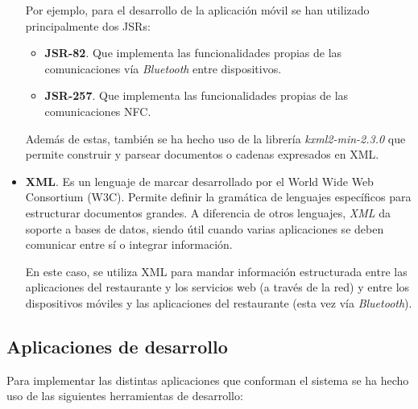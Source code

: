 \begin{itemize}
  Por ejemplo, para el desarrollo de la aplicación móvil se han utilizado
  principalmente dos \acs{JSR}s:
    \begin{itemize}
    \item \textbf{JSR-82}. Que implementa las funcionalidades
    propias de las comunicaciones vía \emph{Bluetooth} entre dispositivos.
    \item \textbf{JSR-257}. Que implementa las funcionalidades propias
    de las comunicaciones \acs{NFC}.
    \end{itemize}

  Además de estas, también se ha hecho uso de la librería
  \emph{kxml2-min-2.3.0} que permite construir y parsear documentos o cadenas 
  expresados en \acs{XML}.

  \item \textbf{XML}.
  Es un lenguaje de marcar desarrollado por el
  World Wide Web Consortium (\acs{W3C}). Permite definir la gramática de
  lenguajes específicos para estructurar documentos grandes. A diferencia de
  otros lenguajes, \emph{XML} da soporte a bases de datos, siendo útil cuando
  varias aplicaciones se deben comunicar entre sí o integrar información.

  En este caso, se utiliza \acs{XML} para mandar información estructurada 
  entre las aplicaciones del restaurante y los servicios web (a través de la
  red) y entre los dispositivos móviles y las aplicaciones del restaurante 
  (esta vez vía \emph{Bluetooth}).
  \end{itemize}

  \subsection{Aplicaciones de desarrollo}
  Para implementar las distintas aplicaciones que conforman el sistema se
  ha hecho uso de las siguientes herramientas de desarrollo:
  
